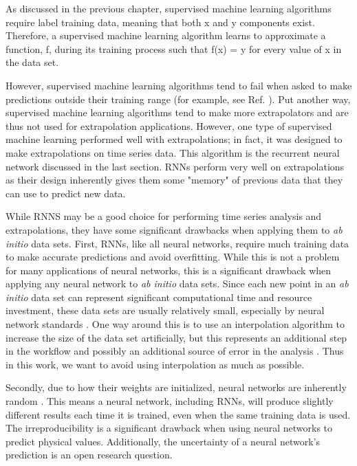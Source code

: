 As discussed in the previous chapter, supervised machine learning algorithms require label training data, meaning that both x and y components exist. Therefore, a supervised machine learning algorithm learns to approximate a function, f, during its training process such that f(x) = y for every value of x in the data set.  

However, supervised machine learning algorithms tend to fail when asked to make predictions outside their training range (for example, see Ref. \cite{Ref6}). Put another way, supervised machine learning algorithms tend to make more extrapolators and are thus not used for extrapolation applications. However, one type of supervised machine learning performed well with extrapolations; in fact, it was designed to make extrapolations on time series data. This algorithm is the recurrent neural network discussed in the last section. RNNs perform very well on extrapolations as their design inherently gives them some "memory" of previous data that they can use to predict new data.

While RNNS may be a good choice for performing time series analysis and extrapolations, they have some significant drawbacks when applying them to \textit{ab initio} data sets. First, RNNs, like all neural networks, require much training data to make accurate predictions and avoid overfitting. While this is not a problem for many applications of neural networks, this is a significant drawback when applying any neural network to \textit{ab initio} data sets. Since each new point in an \textit{ab initio} data set can represent significant computational time and resource investment, these data sets are usually relatively small, especially by neural network standards \cite{Ref6}. One way around this is to use an interpolation algorithm to increase the size of the data set artificially, but this represents an additional step in the workflow and possibly an additional source of error in the analysis \cite{Ref6}. Thus in this work, we want to avoid using interpolation as much as possible.  

Secondly, due to how their weights are initialized, neural networks are inherently random \cite{Ref6}. This means a neural network, including RNNs, will produce slightly different results each time it is trained, even when the same training data is used. The irreproducibility is a significant drawback when using neural networks to predict physical values. Additionally, the uncertainty of a neural network's prediction is an open research question. 

